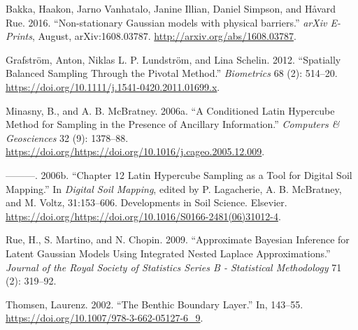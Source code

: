 \documentclass[a4paper]{article}
\begin{document}
\hypertarget{refs}{}
\leavevmode\hypertarget{ref-Bakka-2016-1608}{}%
Bakka, Haakon, Jarno Vanhatalo, Janine Illian, Daniel Simpson, and
Håvard Rue. 2016. ``Non-stationary Gaussian models with physical
barriers.'' \emph{arXiv E-Prints}, August, arXiv:1608.03787.
\url{http://arxiv.org/abs/1608.03787}.

\leavevmode\hypertarget{ref-Grafstrom-2012}{}%
Grafström, Anton, Niklas L. P. Lundström, and Lina Schelin. 2012.
``Spatially Balanced Sampling Through the Pivotal Method.''
\emph{Biometrics} 68 (2): 514--20.
\url{https://doi.org/10.1111/j.1541-0420.2011.01699.x}.

\leavevmode\hypertarget{ref-Minasny-2006-1378}{}%
Minasny, B., and A. B. McBratney. 2006a. ``A Conditioned Latin Hypercube
Method for Sampling in the Presence of Ancillary Information.''
\emph{Computers \& Geosciences} 32 (9): 1378--88.
\url{https://doi.org/https://doi.org/10.1016/j.cageo.2005.12.009}.

\leavevmode\hypertarget{ref-Minasny-2006-153}{}%
---------. 2006b. ``Chapter 12 Latin Hypercube Sampling as a Tool for
Digital Soil Mapping.'' In \emph{Digital Soil Mapping}, edited by P.
Lagacherie, A. B. McBratney, and M. Voltz, 31:153--606. Developments in
Soil Science. Elsevier.
\url{https://doi.org/https://doi.org/10.1016/S0166-2481(06)31012-4}.

\leavevmode\hypertarget{ref-Rue-2009-319}{}%
Rue, H., S. Martino, and N. Chopin. 2009. ``Approximate Bayesian
Inference for Latent Gaussian Models Using Integrated Nested Laplace
Approximations.'' \emph{Journal of the Royal Society of Statistics
Series B - Statistical Methodology} 71 (2): 319--92.

\leavevmode\hypertarget{ref-Thomsen-2002-2002}{}%
Thomsen, Laurenz. 2002. ``The Benthic Boundary Layer.'' In, 143--55.
\url{https://doi.org/10.1007/978-3-662-05127-6_9}.
%


\end{document}
